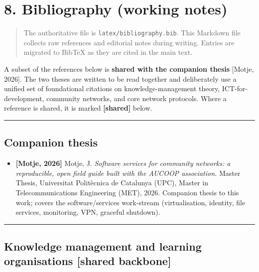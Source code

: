 \hypertarget{bibliography-working-notes}{%
\section{8. Bibliography (working
notes)}\label{bibliography-working-notes}}

\begin{quote}
The authoritative file is \texttt{latex/bibliography.bib}. This Markdown
file collects raw references and editorial notes during writing. Entries
are migrated to BibTeX as they are cited in the main text.
\end{quote}

A subset of the references below is \textbf{shared with the companion
thesis} {[}Motje, 2026{]}. The two theses are written to be read
together and deliberately use a unified set of foundational citations on
knowledge-management theory, ICT-for-development, community networks,
and core network protocols. Where a reference is shared, it is marked
\textbf{{[}shared{]}} below.

\begin{center}\rule{0.5\linewidth}{0.5pt}\end{center}

\hypertarget{companion-thesis}{%
\subsection{Companion thesis}\label{companion-thesis}}

\begin{itemize}
\tightlist
\item
  \textbf{{[}Motje, 2026{]}} Motje, J. \emph{Software services for
  community networks: a reproducible, open field guide built with the
  AUCOOP association.} Master Thesis, Universitat Politècnica de
  Catalunya (UPC), Master in Telecommunications Engineering (MET), 2026.
  Companion thesis to this work; covers the software/services
  work-stream (virtualisation, identity, file services, monitoring, VPN,
  graceful shutdown).
\end{itemize}

\begin{center}\rule{0.5\linewidth}{0.5pt}\end{center}

\hypertarget{knowledge-management-and-learning-organisations-shared-backbone}{%
\subsection{Knowledge management and learning organisations {[}shared
backbone{]}}\label{knowledge-management-and-learning-organisations-shared-backbone}}

